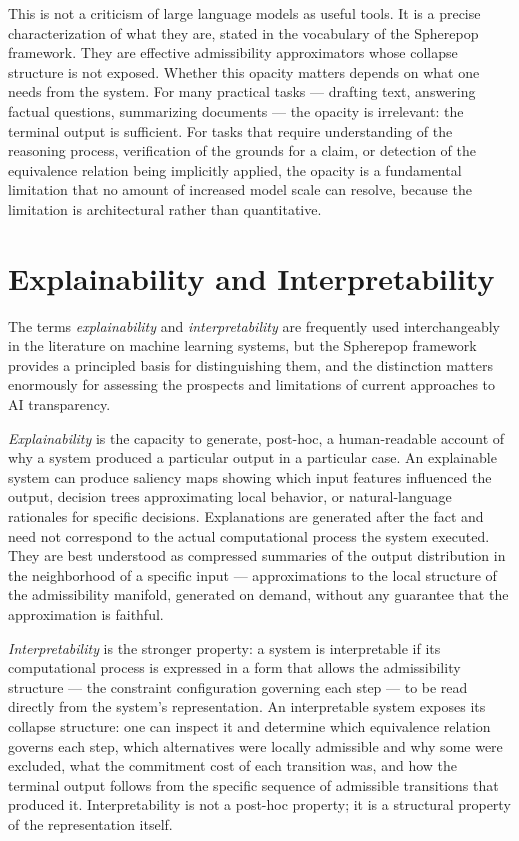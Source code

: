 \documentclass[12pt,openany]{book}
\theoremstyle{plain}
\theoremstyle{definition}
\theoremstyle{remark}
\begin{document}
This is not a criticism of large language models as useful tools. It is a precise characterization of what they are, stated in the vocabulary of the Spherepop framework. They are effective admissibility approximators whose collapse structure is not exposed. Whether this opacity matters depends on what one needs from the system. For many practical tasks — drafting text, answering factual questions, summarizing documents — the opacity is irrelevant: the terminal output is sufficient. For tasks that require understanding of the reasoning process, verification of the grounds for a claim, or detection of the equivalence relation being implicitly applied, the opacity is a fundamental limitation that no amount of increased model scale can resolve, because the limitation is architectural rather than quantitative.

\section{Explainability and Interpretability}

The terms \emph{explainability} and \emph{interpretability} are frequently used interchangeably in the literature on machine learning systems, but the Spherepop framework provides a principled basis for distinguishing them, and the distinction matters enormously for assessing the prospects and limitations of current approaches to AI transparency.

\emph{Explainability} is the capacity to generate, post-hoc, a human-readable account of why a system produced a particular output in a particular case. An explainable system can produce saliency maps showing which input features influenced the output, decision trees approximating local behavior, or natural-language rationales for specific decisions. Explanations are generated after the fact and need not correspond to the actual computational process the system executed. They are best understood as compressed summaries of the output distribution in the neighborhood of a specific input — approximations to the local structure of the admissibility manifold, generated on demand, without any guarantee that the approximation is faithful.

\emph{Interpretability} is the stronger property: a system is interpretable if its computational process is expressed in a form that allows the admissibility structure — the constraint configuration governing each step — to be read directly from the system's representation. An interpretable system exposes its collapse structure: one can inspect it and determine which equivalence relation governs each step, which alternatives were locally admissible and why some were excluded, what the commitment cost of each transition was, and how the terminal output follows from the specific sequence of admissible transitions that produced it. Interpretability is not a post-hoc property; it is a structural property of the representation itself.
\end{document}
